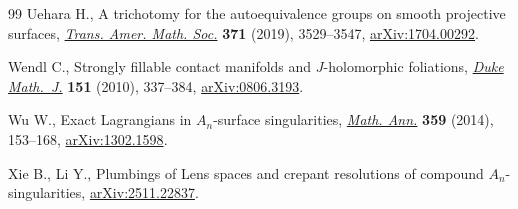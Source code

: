 \begin{thebibliography}{99}
Uehara H., A trichotomy for the autoequivalence groups on smooth projective
 surfaces, \href{https://doi.org/10.1090/tran/7439}{\textit{Trans. Amer. Math.
 Soc.}} \textbf{371} (2019), 3529--3547, \href{http://arxiv.org/abs/1704.00292}{arXiv:1704.00292}.

Wendl C., Strongly fillable contact manifolds and {$J$}-holomorphic foliations,
 \href{https://doi.org/10.1215/00127094-2010-001}{\textit{Duke Math.~J.}}
 \textbf{151} (2010), 337--384, \href{http://arxiv.org/abs/0806.3193}{arXiv:0806.3193}.

Wu W., Exact {L}agrangians in {$A_n$}-surface singularities,
 \href{https://doi.org/10.1007/s00208-013-0993-3}{\textit{Math. Ann.}}
 \textbf{359} (2014), 153--168,
 \href{http://arxiv.org/abs/1302.1598}{arXiv:1302.1598}.

Xie B., Li Y., Plumbings of {L}ens spaces and crepant resolutions of compound
 {${A}_n$}-singularities,
 \href{http://arxiv.org/abs/2511.22837}{arXiv:2511.22837}.

\end{thebibliography}
